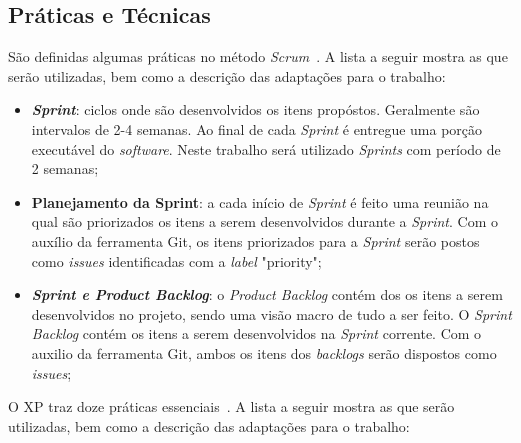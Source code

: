 \subsection{Práticas e Técnicas}
\label{sec:praticas_tecnicas}

São definidas algumas práticas no método \textit{Scrum}~\cite{gutierrez:2009}. A lista a seguir
mostra as que serão utilizadas, bem como a descrição das adaptações para o trabalho:

\begin{itemize}
  \item \textit{\textbf{Sprint}}: ciclos onde são desenvolvidos os itens propóstos. Geralmente
    são intervalos de 2-4 semanas. Ao final de cada \textit{Sprint} é entregue uma porção 
    executável do \textit{software}. Neste trabalho será utilizado \textit{Sprints} com período
    de 2 semanas;
  \item \textbf{Planejamento da Sprint}: a cada início de \textit{Sprint} é feito uma reunião
    na qual são priorizados os itens a serem desenvolvidos durante a \textit{Sprint}.
    Com o auxílio da ferramenta Git, os itens priorizados para a \textit{Sprint} serão
    postos como \textit{issues} identificadas com a \textit{label} "priority";
  \item \textbf{\textit{Sprint e Product Backlog}}: o \textit{Product Backlog} contém dos os itens a serem
    desenvolvidos no projeto, sendo uma visão macro de tudo a ser feito.
    O \textit{Sprint Backlog} contém os itens a serem desenvolvidos na \textit{Sprint} corrente.
  Com o auxilio da ferramenta Git, ambos os itens dos \textit{backlogs} serão dispostos
  como \textit{issues};
\end{itemize}

O XP traz doze práticas essenciais~\cite{gutierrez:2009}. A lista a seguir
mostra as que serão utilizadas, bem como a descrição das adaptações para o trabalho:

